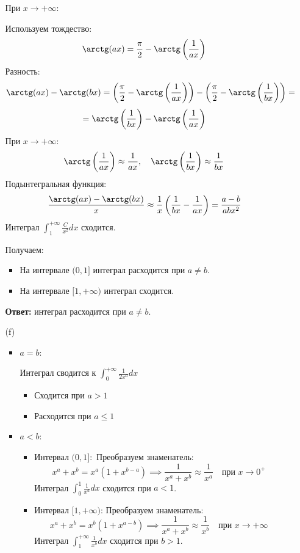 \documentclass[a4paper]{article}
\renewcommand{\leq}{\leqslant}
\begin{document}
\begin{enumerate}
\begin{enumerate}
    При \(x \to +\infty\):  
      
    Используем тождество:  
    \[
    \arctg(ax) = \frac{\pi}{2} - \arctg\left(\frac{1}{ax}\right)
    \]  
    Разность:  
    $$
    \arctg(ax) - \arctg(bx) = \left(\frac{\pi}{2} -
     \arctg\left(\frac{1}{ax}\right)\right) - 
     \left(\frac{\pi}{2} - \arctg\left(\frac{1}{bx}\right)\right) =$$
     $$=
      \arctg\left(\frac{1}{bx}\right) - \arctg\left(\frac{1}{ax}\right)
    $$
    При \(x \to +\infty\):  
    \[
    \arctg\left(\frac{1}{ax}\right) \approx \frac{1}{ax},
     \quad \arctg\left(\frac{1}{bx}\right) \approx \frac{1}{bx}
    \]  
    Подынтегральная функция:  
    \[
    \frac{\arctg(ax) - \arctg(bx)}{x} \approx \frac{1}{x} \left(\frac{1}{bx}
     - \frac{1}{ax}\right) = \frac{a - b}{ab x^2}
    \]  
    Интеграл \(\int_{1}^{+\infty} \frac{C}{x^2} dx\) сходится.

    Получаем:
    \begin{itemize}
      \item На интервале \((0, 1]\) интеграл расходится при \(a \neq b\).  
      \item На интервале \([1, +\infty)\) интеграл сходится.  
    \end{itemize}
    \textbf{Ответ: } интеграл расходится при \(a \neq b\).\\

    \item[(f)]\begin{itemize}
      \item \(a = b\):
      
      Интеграл сводится к \(\int_{0}^{+\infty} \frac{1}{2x^a} dx\)
      \begin{itemize}
        \item 
        Сходится при \(a > 1\)
        \item
        Расходится при \(a \leq 1\)
      \end{itemize}  

      \item \(a < b\):
      \begin{itemize}
        \item Интервал \((0, 1]:\)
        Преобразуем знаменатель:  
        \[
        x^a + x^b = x^a(1 + x^{b-a}) \implies \frac{1}{x^a + x^b} 
        \approx \frac{1}{x^a} \quad \text{при } x \to 0^+
        \]  
        Интеграл \(\int_{0}^{1} \frac{1}{x^a} dx\) сходится при \(a < 1\).

        \item Интервал \([1, +\infty)\):
         Преобразуем знаменатель:  
        \[
        x^a + x^b = x^b(1 + x^{a-b}) \implies \frac{1}{x^a + x^b} 
        \approx \frac{1}{x^b} \quad \text{при } x \to +\infty
        \]  
        Интеграл \(\int_{1}^{+\infty} \frac{1}{x^b} dx\) сходится при \(b > 1\).
      \end{itemize}
    \end{itemize}


\end{enumerate}
\end{enumerate}
\end{document}
